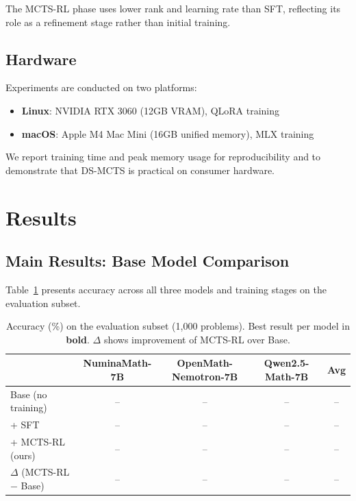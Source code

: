 \documentclass[11pt,a4paper]{article}
\begin{document}
The MCTS-RL phase uses lower rank and learning rate than SFT, reflecting its
role as a refinement stage rather than initial training.

\subsection{Hardware}

Experiments are conducted on two platforms:
\begin{itemize}[nosep]
    \item \textbf{Linux}: NVIDIA RTX 3060 (12GB VRAM), QLoRA training
    \item \textbf{macOS}: Apple M4 Mac Mini (16GB unified memory), MLX training
\end{itemize}

We report training time and peak memory usage for reproducibility and to
demonstrate that DS-MCTS is practical on consumer hardware.


\section{Results}
\label{sec:results}

\subsection{Main Results: Base Model Comparison}

Table~\ref{tab:main_results} presents accuracy across all three models and
training stages on the evaluation subset.

\begin{table}[h]
\centering
\caption{Accuracy (\%) on the evaluation subset (1,000 problems). Best result
per model in \textbf{bold}. $\Delta$ shows improvement of MCTS-RL over Base.}
\label{tab:main_results}
\begin{tabular}{lcccc}
\toprule
 & NuminaMath-7B & OpenMath-Nemotron-7B & Qwen2.5-Math-7B & Avg \\
\midrule
Base (no training)   & -- & -- & -- & -- \\
+ SFT                & -- & -- & -- & -- \\
+ MCTS-RL (ours)     & -- & -- & -- & -- \\
\midrule
$\Delta$ (MCTS-RL $-$ Base) & -- & -- & -- & -- \\
\bottomrule
\end{tabular}
\end{table}
\end{document}
